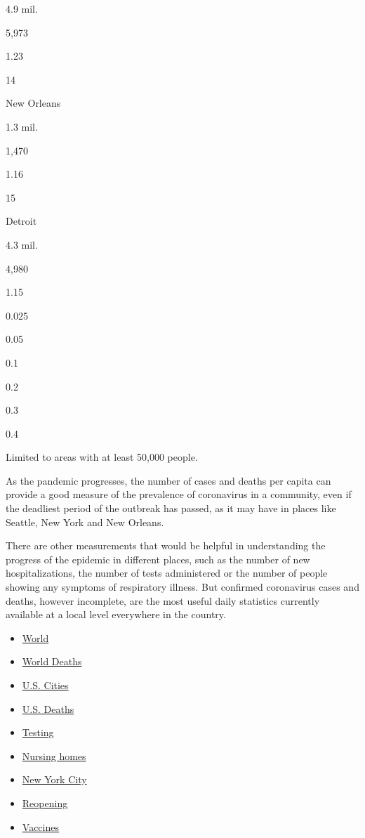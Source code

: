 4.9 mil.

5,973

1.23

14

New Orleans

1.3 mil.

1,470

1.16

15

Detroit

4.3 mil.

4,980

1.15

0.025

0.05

0.1

0.2

0.3

0.4

Limited to areas with at least 50,000 people.

As the pandemic progresses, the number of cases and deaths per capita
can provide a good measure of the prevalence of coronavirus in a
community, even if the deadliest period of the outbreak has passed, as
it may have in places like Seattle, New York and New Orleans.

There are other measurements that would be helpful in understanding the
progress of the epidemic in different places, such as the number of new
hospitalizations, the number of tests administered or the number of
people showing any symptoms of respiratory illness. But confirmed
coronavirus cases and deaths, however incomplete, are the most useful
daily statistics currently available at a local level everywhere in the
country.

\begin{itemize}
\tightlist
\item
  \href{https://www.nytimes.com/interactive/2020/world/coronavirus-maps.html}{World}
\item
  \href{https://www.nytimes.com/interactive/2020/04/21/world/coronavirus-missing-deaths.html}{World
  Deaths}
\item
  \href{https://www.nytimes.com/interactive/2020/04/23/upshot/five-ways-to-monitor-coronavirus-outbreak-us.html}{U.S.
  Cities}
\item
  \href{https://www.nytimes.com/interactive/2020/05/05/us/coronavirus-death-toll-us.html}{U.S.
  Deaths}
\item
  \href{https://www.nytimes.com/interactive/2020/us/coronavirus-testing.html}{Testing}
\item
  \href{https://www.nytimes.com/interactive/2020/us/coronavirus-nursing-homes.html}{Nursing
  homes}
\item
  \href{https://www.nytimes.com/interactive/2020/nyregion/new-york-city-coronavirus-cases.html}{New
  York City}
\item
  \href{https://www.nytimes.com/interactive/2020/us/states-reopen-map-coronavirus.html}{Reopening}
\item
  \href{https://www.nytimes.com/interactive/2020/science/coronavirus-vaccine-tracker.html}{Vaccines}
\end{itemize}

